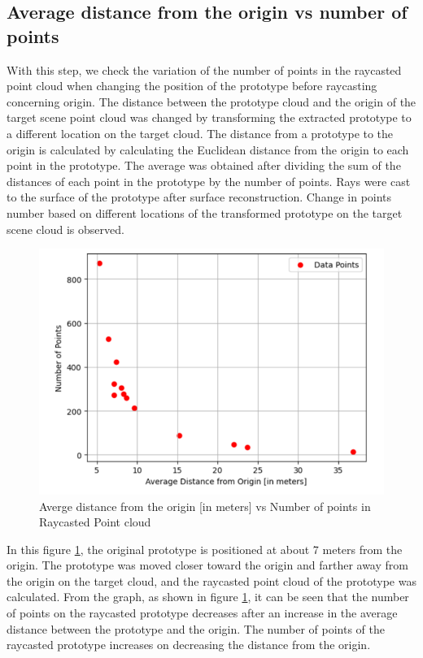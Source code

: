 \subsection{Average distance from the origin vs number of points}
With this step, we check the variation of the number of points in the raycasted point cloud when changing the position of the prototype before raycasting concerning origin. The distance between the prototype cloud and the origin of the target scene point cloud was changed by transforming the extracted prototype to a different location on the target cloud. The distance from a prototype to the origin is calculated by calculating the Euclidean distance from the origin to each point in the prototype. The average was obtained after dividing the sum of the distances of each point in the prototype by the number of points. Rays were cast to the surface of the prototype after surface reconstruction.  Change in points number based on different locations of the transformed prototype on the target scene cloud is observed.

\begin{figure}[htbp]
    \centering
    \includegraphics[width=0.8\linewidth]{97_graphics/evaluation/avg_distn_vs_points_numbers.pdf}
    \caption{Averge distance from the origin [in meters] vs Number of points in Raycasted Point cloud}
    \label{fig:evalution_avg_distn_vs_points_number}
\end{figure}
In this figure \ref{fig:evalution_avg_distn_vs_points_number}, the original prototype is positioned at about 7 meters from the origin. The prototype was moved closer toward the origin and farther away from the origin on the target cloud, and the raycasted point cloud of the prototype was calculated. From the graph, as shown in figure \ref{fig:evalution_avg_distn_vs_points_number}, it can be seen that the number of points on the raycasted prototype decreases after an increase in the average distance between the prototype and the origin. The number of points of the raycasted prototype increases on decreasing the distance from the origin.

